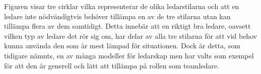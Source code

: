 \newline
Figuren visar tre cirklar vilka representerar de olika ledarstilarna och att en ledare inte nödvändigtvis behöver tillämpa en av de tre stilarna utan kan tillämpa flera av dem samtidigt. Detta innebär att en riktigt bra ledare, oavsett vilken typ av ledare det rör sig om, har delar av alla tre stilarna för att vid behov kunna använda den som är mest lämpad för situationen. Dock är detta, som tidigare nämnts, en av många modeller för ledarskap men har valts som exempel för att den är generell och lätt att tillämpa på rollen som teamledare.